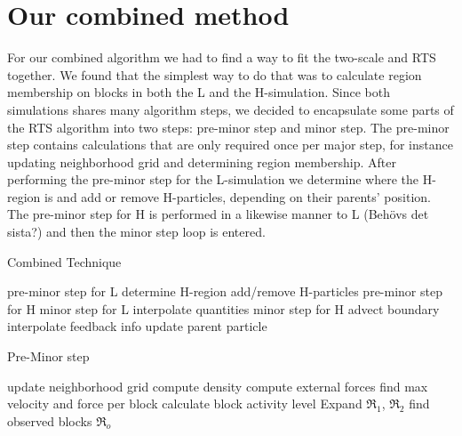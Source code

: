 \documentclass[../../main.tex]{subfiles}
\begin{document}


\section{Our combined method}
For our combined algorithm we had to find a way to fit the two-scale and RTS together. We found that the simplest way to do that was to calculate region membership on blocks in both the L and the H-simulation. Since both simulations shares many algorithm steps, we decided to encapsulate some parts of the RTS algorithm into two steps: pre-minor step and minor step. The pre-minor step contains calculations that are only required once per major step, for instance updating neighborhood grid and determining region membership. After performing the pre-minor step for the L-simulation we determine where the H-region is and add or remove H-particles, depending on their parents' position. The pre-minor step for H is performed in a likewise manner to L (Behövs det sista?) and then the minor step loop is entered. 

\begin{algorithm}[h]
    \caption{Combined Technique}
    \label{alg:combined:main}
    \begin{algorithmic}[1]
            \State pre-minor step for L
            \State determine H-region
            \State add/remove H-particles
            \State pre-minor step for H
                \State minor step for L
                \State interpolate quantities
                  \State minor step for H
                  \State advect boundary
                \EndFor
            \State interpolate feedback info
            \EndFor
            \State update parent particle
        \EndWhile
   \end{algorithmic}
\end{algorithm}


\begin{algorithm}[h]
    \caption{Pre-Minor step}
    \label{alg:combined:preminorstep}
    \begin{algorithmic}[1]
    \State update neighborhood grid
    \State compute density
    \State compute external forces
    \State find max velocity and force per block
    \State calculate block activity level
    \State Expand $\Re$$_1$, $\Re$$_2$
    \State find observed blocks $\Re$$_o$
   \end{algorithmic}
\end{algorithm}
\end{document}
